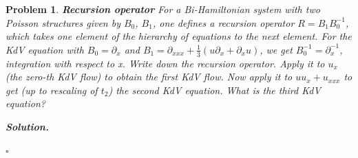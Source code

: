 \documentclass[12pt]{report}
\newtheorem{problem}{Problem}
\newenvironment{solution}[1][\it{Solution}]{\textbf{#1. } }{$\square$}
\begin{document}
\begin{problem}
    {\bf Recursion operator} For a Bi-Hamiltonian system with two Poisson
structures given by $B_0$, $B_1$, one defines a recursion operator $R=B_1
B_0^{-1}$, which takes one element of the hierarchy of equations to the next
element. For the KdV equation with $B_0=\partial_x$ and $B_1=
\partial_{xxx}+\frac{1}{3}(u\partial_x+\partial_x u)$, we get $B_0^{-1}=\partial_x^{-1}$, integration with
respect to x. Write down the recursion operator. Apply it to $u_x$ (the zero-th
KdV flow)  to obtain the first KdV flow. Now apply it to $uu_x+u_{xxx}$ to get
(up to rescaling of $t_2$) the second KdV equation. What is the third KdV
equation?
\end{problem}

\begin{solution}


\end{solution}
\end{document}
